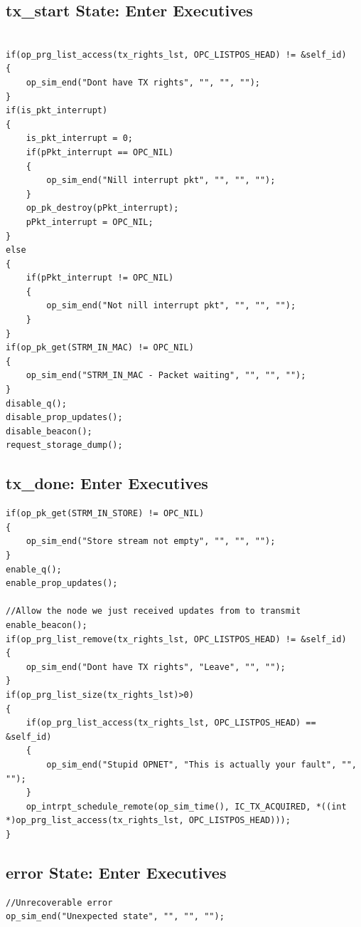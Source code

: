 \subsection{tx_start State: Enter Executives}
{\tiny
\begin{verbatim}

if(op_prg_list_access(tx_rights_lst, OPC_LISTPOS_HEAD) != &self_id)
{
	op_sim_end("Dont have TX rights", "", "", "");	
}
if(is_pkt_interrupt)
{
	is_pkt_interrupt = 0;	
	if(pPkt_interrupt == OPC_NIL)
	{
		op_sim_end("Nill interrupt pkt", "", "", "");	
	}		
	op_pk_destroy(pPkt_interrupt);
	pPkt_interrupt = OPC_NIL;
}
else
{
	if(pPkt_interrupt != OPC_NIL)
	{
		op_sim_end("Not nill interrupt pkt", "", "", "");	
	}
}
if(op_pk_get(STRM_IN_MAC) != OPC_NIL)
{
	op_sim_end("STRM_IN_MAC - Packet waiting", "", "", "");	
}
disable_q();
disable_prop_updates();
disable_beacon();
request_storage_dump();

\end{verbatim}
}

\subsection{tx_done: Enter Executives}
{\tiny
\begin{verbatim}
if(op_pk_get(STRM_IN_STORE) != OPC_NIL)
{
	op_sim_end("Store stream not empty", "", "", "");
}
enable_q();
enable_prop_updates();

//Allow the node we just received updates from to transmit
enable_beacon();
if(op_prg_list_remove(tx_rights_lst, OPC_LISTPOS_HEAD) != &self_id)
{
	op_sim_end("Dont have TX rights", "Leave", "", "");	
}
if(op_prg_list_size(tx_rights_lst)>0)
{
	if(op_prg_list_access(tx_rights_lst, OPC_LISTPOS_HEAD) == &self_id)
	{
		op_sim_end("Stupid OPNET", "This is actually your fault", "", "");	
	}
	op_intrpt_schedule_remote(op_sim_time(), IC_TX_ACQUIRED, *((int *)op_prg_list_access(tx_rights_lst, OPC_LISTPOS_HEAD)));
}

\end{verbatim}
}


\subsection{error State: Enter Executives}
{\tiny
\begin{verbatim}
//Unrecoverable error
op_sim_end("Unexpected state", "", "", "");
\end{verbatim}
}


